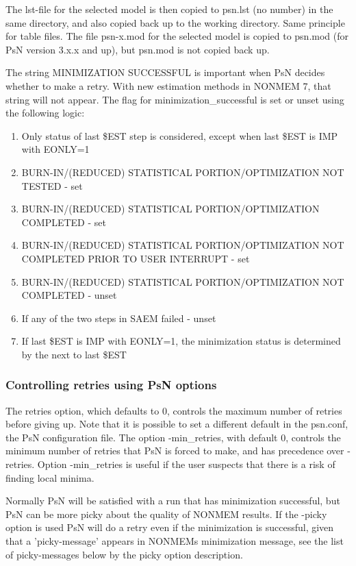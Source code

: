The lst-file for the selected model is then copied to psn.lst (no number) in the same directory, and also copied back up to the working directory. Same principle for table files. The file psn-x.mod for the selected model is copied to psn.mod (for PsN version 3.x.x and up), but psn.mod is not copied back up.   	

The string MINIMIZATION SUCCESSFUL is important when PsN decides whether to make a retry. With new estimation methods in NONMEM 7, that string will not appear. The flag for minimization\_successful is set or unset using the following logic:

\begin{enumerate}
\item Only status of last \$EST step is considered, except when last \$EST is IMP with EONLY=1
\item BURN-IN/(REDUCED) STATISTICAL PORTION/OPTIMIZATION NOT TESTED - set
\item BURN-IN/(REDUCED) STATISTICAL PORTION/OPTIMIZATION COMPLETED -  set
\item BURN-IN/(REDUCED) STATISTICAL PORTION/OPTIMIZATION NOT COMPLETED PRIOR TO USER INTERRUPT - set
\item BURN-IN/(REDUCED) STATISTICAL PORTION/OPTIMIZATION NOT COMPLETED - unset
\item If any of the two steps in SAEM failed - unset 
\item If last \$EST is IMP with EONLY=1, the minimization status is determined by the next to last \$EST
\end{enumerate}

\subsubsection{Controlling retries using PsN options}
The retries option, which defaults to 0, controls the maximum number of retries before giving up. Note that it is possible to set a different default in the psn.conf, the PsN configuration file. The option -min\_retries, with default 0, controls the minimum number of retries that PsN is forced to make, and has precedence over -retries. Option -min\_retries is useful if the user suspects that there is a risk of finding local minima.

Normally PsN will be satisfied with a run that has minimization successful, but PsN can be more picky about the quality of NONMEM results. If the -picky option is used PsN will do a retry even if the minimization is successful, given that a 'picky-message' appears in NONMEMs minimization message, see the list of picky-messages below by the picky option description.

